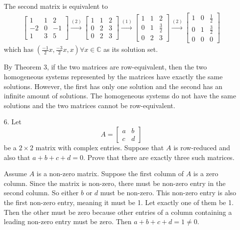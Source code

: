 \documentclass{article}
\begin{document}
\begin{enumerate}[listparindent=\parindent]
The second matrix is equivalent to
\begin{gather*}
    \begin{bmatrix}
        1 & 1 & 2 \\
        -2 & 0 & -1 \\
        1 & 3 & 5
    \end{bmatrix}
    \xrightarrow{(2)}
    \begin{bmatrix}
        1 & 1 & 2 \\
        0 & 2 & 3 \\
        0 & 2 & 3
    \end{bmatrix}
    \xrightarrow{(1)}
    \begin{bmatrix}
        1 & 1 & 2 \\
        0 & 1 & \frac{3}{2} \\
        0 & 2 & 3
    \end{bmatrix}
    \xrightarrow{(2)}
    \boxed{
        \begin{bmatrix}
            1 & 0 & \frac{1}{2} \\
            0 & 1 & \frac{3}{2} \\
            0 & 0 & 0
        \end{bmatrix}
    }
\end{gather*}
which has \( (\frac{-1}{2}x, \frac{-3}{2}x, x) \forall x \in \mathbb C \) as its solution set.

By Theorem 3, if the two matrices are row-equivalent,
then the two homogeneous systems represented by the matrices have exactly the same solutions.
However, the first has only one solution and the second has an infinite amount of solutions.
The homogeneous systems do not have the same solutions and the two matrices cannot be row-equivalent.

\item[6.] Let
    \[
        A = \begin{bmatrix}
            a & b \\ c & d
        \end{bmatrix}
    \]
    be a \(2 \times 2\) matrix with complex entries. Suppose that \(A\) is row-reduced and also that \(a + b + c + d = 0\).
    Prove that there are exactly three such matrices.

Assume \(A\) is a non-zero matrix.
Suppose the first column of \(A\) is a zero column.
Since the matrix is non-zero, there must be non-zero entry in the second column. So either \(b\) or \(d\) must be non-zero.
This non-zero entry is also the first non-zero entry, meaning it must be 1. Let exactly one of them be 1.
Then the other must be zero because other entries of a column containing a leading non-zero entry must be zero.
Then \(a + b + c + d = 1 \neq 0\).


\end{enumerate}
\end{document}

